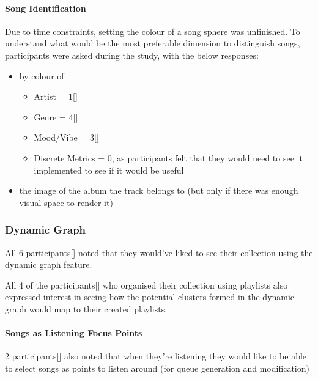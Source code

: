\paragraph{Song Identification}
Due to time constraints, setting the colour of a song sphere was unfinished. To understand what would be the most preferable dimension to distinguish songs, participants were asked during the study, with the below responses:\begin{itemize}
    \item by colour of\begin{itemize}
        \item Artist = 1[]
        \item Genre = 4[]
        \item Mood/Vibe = 3[]
        \item Discrete Metrics = 0, as participants felt that they would need to see it implemented to see if it would be useful
    \end{itemize}
    \item the image of the album the track belongs to (but only if there was enough visual space to render it)
\end{itemize}

\subsubsection{Dynamic Graph}
All 6 participants[] noted that they would've liked to see their collection using the dynamic graph feature.

All 4 of the participants[] who organised their collection using playlists also expressed interest in seeing how the potential clusters formed in the dynamic graph would map to their created playlists.

\paragraph{Songs as Listening Focus Points}
2 participants[] also noted that when they're listening they would like to be able to select songs as points to listen around (for queue generation and modification)